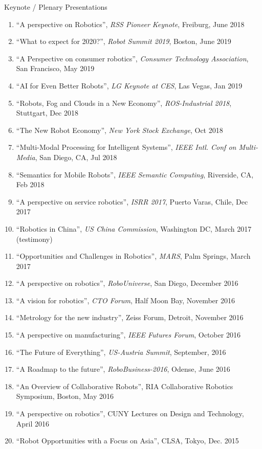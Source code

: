 \documentclass{article}
\begin{document}
\begin{cv}
\begin{cvlist}{Keynote / Plenary Presentations}
\begin{enumerate}
  \item ``A perspective on Robotics'', {\em RSS Pioneer Keynote}, Freiburg, June 2018
  \item ``What to expect for 2020?'', {\em Robot Summit 2019}, Boston, June 2019
  \item ``A Perspective on consumer robotics'', {\em Consumer Technology Association}, San Francisco, May 2019
  \item ``AI for Even Better Robots'', {\em LG Keynote at CES}, Las Vegas, Jan 2019
  \item ``Robots, Fog and Clouds in a New Economy'', {\em ROS-Industrial 2018}, Stuttgart, Dec 2018
  \item ``The New Robot Economy'', {\em New York Stock Exchange}, Oct 2018
  \item ``Multi-Modal Processing for Intelligent Systems'', {\em IEEE Intl. Conf on Multi-Media}, San Diego, CA, Jul 2018
  \item ``Semantics for Mobile Robots'', {\em IEEE Semantic Computing}, Riverside, CA, Feb 2018
  \item ``A perspective on service robotics'', {\em ISRR 2017}, Puerto Varas, Chile, Dec 2017
  \item ``Robotics in China'', {\em US China Commission}, Washington DC, March 2017 (testimony)
  \item ``Opportunities and Challenges in Robotics'', {\em MARS}, Palm Springs, March 2017
  \item ``A perspective on robotics'', {\em RoboUniverse}, San Diego,  December 2016
  \item ``A vision for robotics'', {\em CTO Forum}, Half Moon Bay, November 2016
  \item ``Metrology for the new industry'', Zeiss Forum, Detroit,  November 2016
  \item ``A perspective on manufacturing'', {\em IEEE Futures Forum},  October 2016
  \item ``The Future of Everything'', {\em US-Austria Summit},  September, 2016
  \item ``A Roadmap to the future'', {\em RoboBusiness-2016}, Odense,  June 2016
  \item ``An Overview of Collaborative Robots'', RIA Collaborative Robotics Symposium, Boston, May 2016
  \item ``A perspective on robotics'', CUNY Lectures on Design and Technology, April 2016
  \item ``Robot Opportunities with a Focus on Asia'', CLSA, Tokyo,  Dec. 2015

\end{enumerate}
\end{cvlist}
\end{cv}
\end{document}
